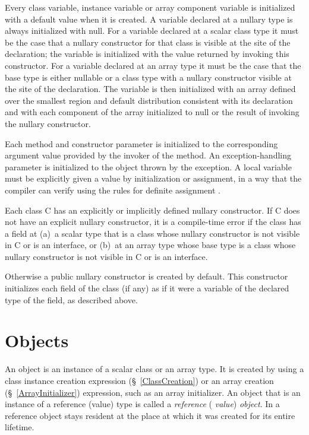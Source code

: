 Every class variable, instance variable or array component variable is
initialized with a default value when it is created.  A variable
declared at a nullary type is always initialized with {\cf null}. For
a variable declared at a scalar class type it must be the case that a
nullary constructor for that class is visible at the site of the
declaration; the variable is initialized with the value returned by
invoking this constructor. For a variable declared at an array type it
must be the case that the base type is either nullable or a class type
with a nullary constructor visible at the site of the declaration. The
variable is then initialized with an array defined over the smallest
region and default distribution consistent with its declaration and
with each component of the array initialized to {\cf null} or the
result of invoking the nullary constructor.

Each method and constructor parameter is initialized to the
corresponding argument value provided by the invoker of the method. An
exception-handling parameter is initialized to the object thrown by
the exception. A local variable must be explicitly given a value by
initialization or assignment, in a way that the compiler can verify
using the rules for definite assignment \cite[\S~16]{jls2}.

Each class {\cf C} has an explicitly or implicitly defined nullary
constructor. If {\cf C} does not have an explicit nullary
constructor, it is a compile-time error if the class has a field at (a)~a
scalar type that is a {\cf class} whose nullary constructor is not
visible in {\cf C} or is an {\cf interface}, or (b)~at an array type whose
base type is a {\cf class} whose nullary constructor is not visible in
{\cf C} or is an {\cf interface}.

Otherwise a {\cf public} nullary constructor is created by
default. This constructor initializes each field of the class (if any)
as if it were a variable of the declared type of the field, as
described above.


\section{Objects}\label{XtenObjects}

An object is an instance of a scalar class or an array type. It is
created by using a class instance creation expression
(\S~\ref{ClassCreation}) or an array creation (\S~\ref{ArrayInitializer})
expression, such as an array initializer. An object that is an
instance of a reference (value) type is called a {\em reference} ({\em
value}) {\em object}. In \XtenCurrVer{} a reference object stays
resident at the place at which it was created for its entire lifetime.

